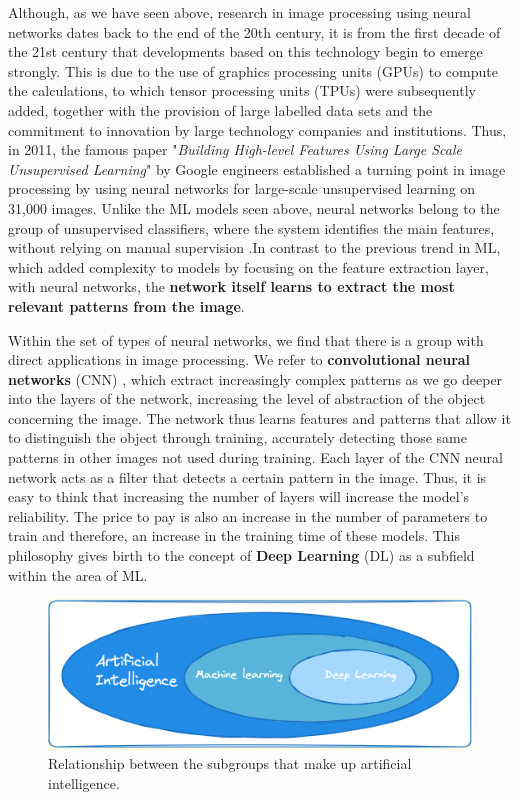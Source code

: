 Although, as we have seen above, research in image processing using neural networks dates back to the end of the 20th century, it is from the first decade of the 21st century that developments based on this technology begin to emerge strongly. This is due to the use of graphics processing units (GPUs) to compute the calculations, to which tensor processing units (TPUs) were subsequently added, together with the provision of large labelled data sets and the commitment to innovation by large technology companies and institutions. Thus, in 2011, the famous paper "\textit{Building High-level Features Using Large Scale Unsupervised Learning}" \cite{le_building_2012} by Google engineers established a turning point in image processing by using neural networks for large-scale unsupervised learning on 31,000 images. Unlike the ML models seen above, neural networks belong to the group of unsupervised classifiers, where the system identifies the main features, without relying on manual supervision \cite{Le2011BuildingHF}.In contrast to the previous trend in ML, which added complexity to models by focusing on the feature extraction layer, with neural networks, the\textbf{ network itself learns to extract the most relevant patterns from the image}.

Within the set of types of neural networks, we find that there is a group with direct applications in image processing. We refer to \textbf{convolutional neural networks} (CNN) \cite{shiri_comprehensive_nodate} \cite{chen_review_2021}, which extract increasingly complex patterns as we go deeper into the layers of the network, increasing the level of abstraction of the object concerning the image. The network thus learns features and patterns that allow it to distinguish the object through training, accurately detecting those same patterns in other images not used during training. Each layer of the CNN neural network acts as a filter that detects a certain pattern in the image. Thus, it is easy to think that increasing the number of layers will increase the model's reliability. The price to pay is also an increase in the number of parameters to train and therefore, an increase in the training time of these models. This philosophy gives birth to the concept of \textbf{Deep Learning }(DL) \cite{noauthor_what_nodate} as a subfield within the area of ML.

\begin{figure}[ht]
    \begin{center}
        \includegraphics[scale=0.60]{images/AI_Group.png}
        \caption{Relationship between the subgroups that make up artificial intelligence.}
    \label{fig:IA Subgroup}    
    \end{center}
\end{figure}


